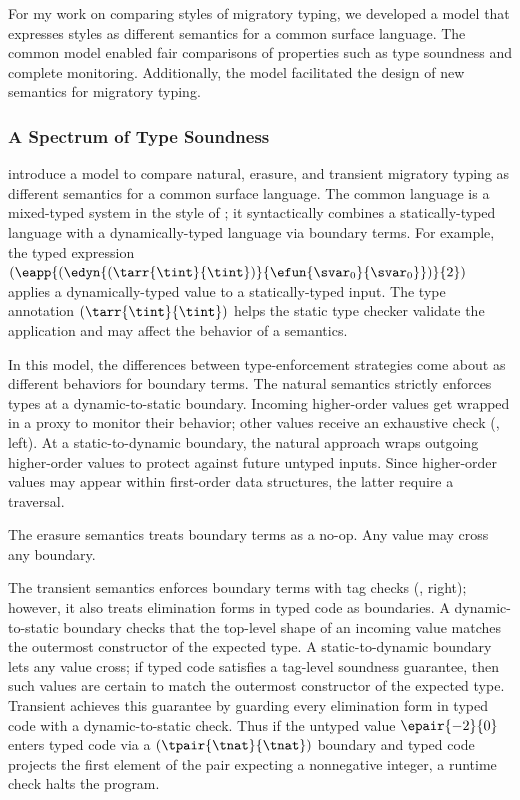 For my work on comparing styles of migratory typing, we developed
 a model that expresses styles as different semantics
 for a common surface language.
The common model enabled fair comparisons of properties
 such as type soundness and complete monitoring.
Additionally, the model facilitated the design of new semantics for migratory
 typing.

\subsubsection{A Spectrum of Type Soundness}


\citet{gf-icfp-2018} introduce a model to compare natural, erasure, and
 transient migratory typing as different semantics for a common surface
 language.
The common language is a mixed-typed system in the style of \citet{mf-toplas-2009};
 it syntactically combines a statically-typed language with a dynamically-typed
 language via boundary terms.
For example, the typed expression
 $(\eapp{(\edyn{(\tarr{\tint}{\tint})}{\efun{\svar_0}{\svar_0}})}{2})$
 applies a dynamically-typed value to a statically-typed input.
The type annotation $(\tarr{\tint}{\tint})$ helps the static type checker
 validate the application and may affect the behavior of a semantics.

In this model, the differences between type-enforcement strategies
 come about as different behaviors for boundary terms.
The natural semantics strictly enforces types at a dynamic-to-static
 boundary.
Incoming higher-order values get wrapped in a proxy to monitor their
 behavior; other values receive an exhaustive check (, left).
At a static-to-dynamic boundary, the natural approach wraps outgoing
 higher-order values to protect against future untyped inputs.
Since higher-order values may appear within first-order data structures,
 the latter require a traversal.

The erasure semantics treats boundary terms as a no-op.
Any value may cross any boundary.

The transient semantics enforces boundary terms with tag checks (, right);
 however, it also treats elimination forms in typed code as boundaries.
A dynamic-to-static boundary checks that the top-level shape of an incoming
 value matches the outermost constructor of the expected type.
A static-to-dynamic boundary lets any value cross; if typed code satisfies a
 tag-level soundness guarantee, then such values are certain to match the
 outermost constructor of the expected type.
Transient achieves this guarantee by guarding every elimination form in typed
 code with a dynamic-to-static check.
Thus if the untyped value $\epair{{-2}}{{0}}$ enters typed code via a
 $(\tpair{\tnat}{\tnat})$ boundary and typed code projects the first element
 of the pair expecting a nonnegative integer, a runtime check halts the program.

